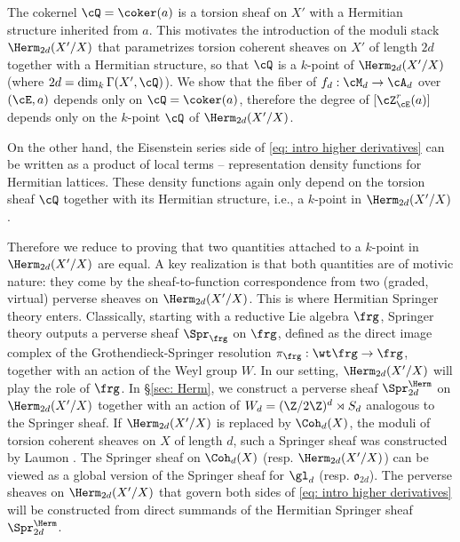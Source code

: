 The cokernel $\cQ=\coker(a)$ is a torsion sheaf on $X'$ with a Hermitian structure inherited from $a$. This motivates the introduction of the moduli stack $\Herm_{2d}(X'/X)$ that parametrizes torsion coherent sheaves on $X'$ of length $2d$ together with a Hermitian structure, so that $\cQ$ is a $k$-point of $\Herm_{2d}(X'/X)$ (where $2d=\dim_{k}\Gamma(X',\cQ)$). We show that the fiber of $f_{d}:\cM_{d}\to \cA_{d}$ over $(\cE,a)$ depends only on $\cQ=\coker(a)$, therefore the degree of $[\cZ^{r}_{\cE}(a)]$ depends only on the $k$-point $\cQ$ of $\Herm_{2d}(X'/X)$.





On the other hand, the Eisenstein series side of \eqref{eq: intro higher derivatives} can be written as a product of local terms -- representation density functions for Hermitian lattices. These density functions again only depend on the torsion sheaf $\cQ$ together with its Hermitian structure, i.e., a $k$-point in $\Herm_{2d}(X'/X)$.

Therefore we reduce to proving that two quantities attached to a $k$-point in $\Herm_{2d}(X'/X)$ are equal. A key realization is that both quantities are of motivic nature: they come by the sheaf-to-function correspondence from two   (graded, virtual) perverse sheaves on $\Herm_{2d}(X'/X)$. This is where Hermitian Springer theory enters.  Classically, starting with a reductive Lie algebra $\frg$, Springer theory outputs a perverse sheaf $\Spr_{\frg}$ on $\frg$, defined as the direct image complex of the Grothendieck-Springer resolution $\pi_{\frg}: \wt\frg\to \frg$,  together with an action of the Weyl group $W$. In our setting, $\Herm_{2d}(X'/X)$ will play the role of $\frg$.  In  \S\ref{sec: Herm}, we construct a perverse sheaf $\Spr^{\Herm}_{2d}$ on $\Herm_{2d}(X'/X)$ together with an action of $W_{d}=(\Z/2\Z)^{d}\rtimes S_{d}$ analogous to the Springer sheaf.  If $\Herm_{2d}(X'/X)$ is replaced by $\Coh_{d}(X)$, the moduli of torsion coherent sheaves on $X$ of length $d$, such a Springer sheaf was constructed by Laumon \cite{Lau87}. The Springer sheaf on $\Coh_{d}(X)$ (resp. $\Herm_{2d}(X'/X)$) can be viewed as a global version of the Springer sheaf for $\gl_{d}$ (resp. $\mathfrak{o}_{2d}$). The perverse sheaves on $\Herm_{2d}(X'/X)$ that govern both sides of \eqref{eq: intro higher derivatives} will be constructed from direct summands of the Hermitian Springer sheaf $\Spr^{\Herm}_{2d}$.


